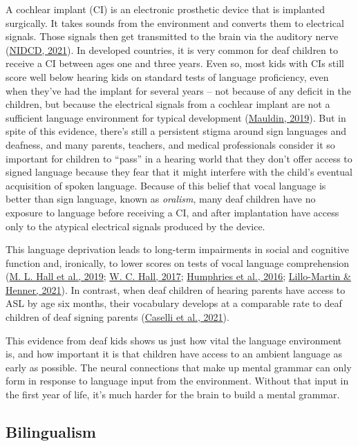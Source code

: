 \documentclass[
]{krantz}
\begin{document}
A cochlear implant (CI) is an electronic prosthetic device that is implanted surgically. It takes sounds from the environment and converts them to electrical signals. Those signals then get transmitted to the brain via the auditory nerve (\protect\hyperlink{ref-NIH-NIDCD}{NIDCD, 2021}). In developed countries, it is very common for deaf children to receive a CI between ages one and three years. Even so, most kids with CIs still score well below hearing kids on standard tests of language proficiency, even when they've had the implant for several years -- not because of any deficit in the children, but because the electrical signals from a cochlear implant are not a sufficient language environment for typical development (\protect\hyperlink{ref-mauldin2019}{Mauldin, 2019}). But in spite of this evidence, there's still a persistent stigma around sign languages and deafness, and many parents, teachers, and medical professionals consider it so important for children to ``pass'' in a hearing world that they don't offer access to signed language because they fear that it might interfere with the child's eventual acquisition of spoken language. Because of this belief that vocal language is better than sign language, known as \emph{oralism}, many deaf children have no exposure to language before receiving a CI, and after implantation have access only to the atypical electrical signals produced by the device.

This language deprivation leads to long-term impairments in social and cognitive function and, ironically, to lower scores on tests of vocal language comprehension (\protect\hyperlink{ref-hall2019}{M. L. Hall et al., 2019}; \protect\hyperlink{ref-hall2017}{W. C. Hall, 2017}; \protect\hyperlink{ref-humphries2016}{Humphries et al., 2016}; \protect\hyperlink{ref-lillo2021}{Lillo-Martin \& Henner, 2021}). In contrast, when deaf children of hearing parents have access to ASL by age six months, their vocabulary develops at a comparable rate to deaf children of deaf signing parents (\protect\hyperlink{ref-caselli2021}{Caselli et al., 2021}).

This evidence from deaf kids shows us just how vital the language environment is, and how important it is that children have access to an ambient language as early as possible. The neural connections that make up mental grammar can only form in response to language input from the environment. Without that input in the first year of life, it's much harder for the brain to build a mental grammar.

\hypertarget{bilingualism}{%
\subsection*{Bilingualism}\label{bilingualism}}
\end{document}
